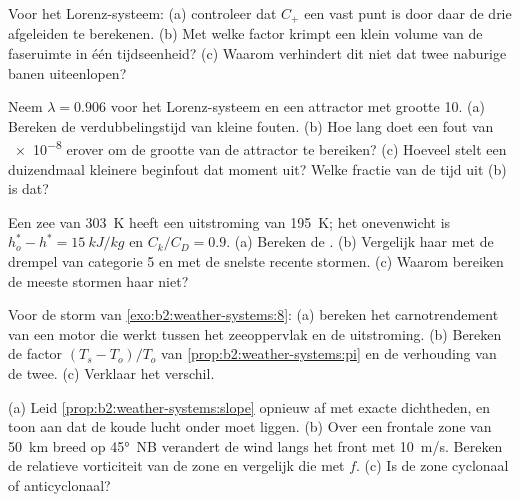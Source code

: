 \begin{exercise}[$\star\star$]\label{exo:b2:weather-systems:6}
Voor het Lorenz-systeem: (a) controleer dat $C_+$ een vast punt is door daar de drie afgeleiden
te berekenen. (b) Met welke factor krimpt een klein volume van de faseruimte in één tijdseenheid? (c) Waarom
verhindert dit niet dat twee naburige banen uiteenlopen?
\end{exercise}

\begin{exercise}[$\star\star$]\label{exo:b2:weather-systems:7}
Neem $\lambda = 0.906$ voor het Lorenz-systeem en een attractor met grootte 10. (a) Bereken de
verdubbelingstijd van kleine fouten. (b) Hoe lang doet een fout van \num{e-8} erover om de grootte van
de attractor te bereiken? (c) Hoeveel stelt een duizendmaal kleinere beginfout dat moment uit? Welke
fractie van de tijd uit (b) is dat?
\end{exercise}

\begin{exercise}[$\star\star$]\label{exo:b2:weather-systems:8}
Een zee van \qty{303}{K} heeft een uitstroming van \qty{195}{K}; het onevenwicht is $h_o^* - h^* =
\qty{15}{kJ/kg}$ en $C_k/C_D = 0.9$. (a) Bereken de . (b) Vergelijk haar met
de drempel van categorie 5 en met de snelste recente stormen. (c) Waarom bereiken de meeste stormen
haar niet?
\end{exercise}

\begin{exercise}[$\star\star$]\label{exo:b2:weather-systems:9}
Voor de storm van \cref{exo:b2:weather-systems:8}: (a) bereken het carnotrendement van een motor
die werkt tussen het zeeoppervlak en de uitstroming. (b) Bereken de factor $(T_s - T_o)/T_o$ van
\cref{prop:b2:weather-systems:pi} en de verhouding van de twee. (c) Verklaar het verschil.
\end{exercise}

\begin{exercise}[$\star\star\star$]\label{exo:b2:weather-systems:10}
(a) Leid \cref{prop:b2:weather-systems:slope} opnieuw af met exacte dichtheden, en toon aan dat
de koude lucht onder moet liggen. (b) Over een frontale zone van \qty{50}{km} breed op \ang{45}~NB verandert de wind
langs het front met \qty{10}{m/s}. Bereken de relatieve vorticiteit van de zone en vergelijk
die met $f$. (c) Is de zone cyclonaal of anticyclonaal?
\end{exercise}


